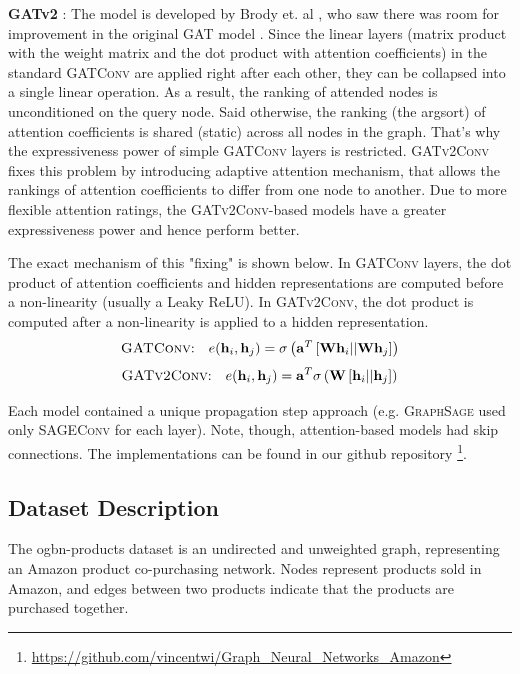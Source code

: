 \documentclass[sigconf, nonacm]{acmart}
\begin{document}
\textbf{GATv2} : The model is developed by Brody et. al \cite{Brodyetal}, who saw there was room for improvement in the original \textsc{GAT} model \cite{Velickovic2017}. Since the linear layers (matrix product with the weight matrix and the dot product with attention coefficients) in the standard \textsc{GATConv} are applied right after each other, they can be collapsed into a single linear operation. As a result, the ranking of attended nodes is unconditioned on the query node. Said otherwise, the ranking (the argsort) of attention coefficients is shared (static) across all nodes in the graph. That's why the expressiveness power of simple \textsc{GATConv} layers is restricted. \textsc{GATv2Conv} fixes this problem by introducing adaptive attention mechanism, that allows the rankings of attention coefficients to differ from one node to another. Due to more flexible attention ratings, the \textsc{GATv2Conv}-based models have a greater expressiveness power and hence perform better.

The exact mechanism of this "fixing" is shown below. In \textsc{GATConv} layers, the dot product of attention coefficients and hidden representations are computed before a non-linearity (usually a Leaky ReLU). In \textsc{GATv2Conv}, the dot product is computed after a non-linearity is applied to a hidden representation.
\begin{align} \text{\textsc{GATConv}:} \quad e(\mathbf h_i, \mathbf h_j) = \sigma\left( \mathbf{a}^T \left[\mathbf W \mathbf h_i || \mathbf W \mathbf h_j \right] \right)
\end{align}
\begin{align} 
\text{\textsc{GATv2Conv}:} \quad e(\mathbf h_i, \mathbf h_j) = \mathbf{a}^T\sigma\left( \mathbf W\left[\mathbf h_i || \mathbf h_j \right] \right)
\end{align}

Each model contained a unique propagation step approach (e.g. \textsc{GraphSage} used only \textsc{SAGEConv} for each layer). Note, though, attention-based models had skip connections. The implementations can be found in our github repository \footnote{ \href{https://github.com/vincentwi/Graph_Neural_Networks_Amazon}{https://github.com/vincentwi/Graph\_Neural\_Networks\_Amazon}}. 

\subsection*{Dataset Description}
The ogbn-products dataset is an undirected and unweighted graph, representing an Amazon product co-purchasing network. Nodes represent products sold in Amazon, and edges between two products indicate that the products are purchased together.
\end{document}
